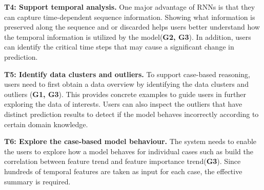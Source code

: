 \textbf{T4: Support temporal analysis.}
One major advantage of RNNs is that they can capture time-dependent sequence information.
Showing what information is preserved along the sequence and or discarded helps users better understand how the temporal information is utilized by the model(\textbf{G2, G3}).
In addition, users can identify the critical time steps that may cause a significant change in prediction.

\textbf{T5: Identify data clusters and outliers.}
To support case-based reasoning, users need to first obtain a data overview by identifying the data clusters and outliers (\textbf{G1, G3}).
This provides concrete examples to guide users in further exploring the data of interests.
Users can also inspect the outliers that have distinct prediction results to detect if the model behaves incorrectly according to certain domain knowledge.

\textbf{T6: Explore the case-based model behaviour.}
The system needs to enable the users to explore how a model behaves for individual cases such as build the correlation between feature trend and feature importance trend(\textbf{G3}). 
Since hundreds of temporal features are taken as input for each case, the effective summary is required.




